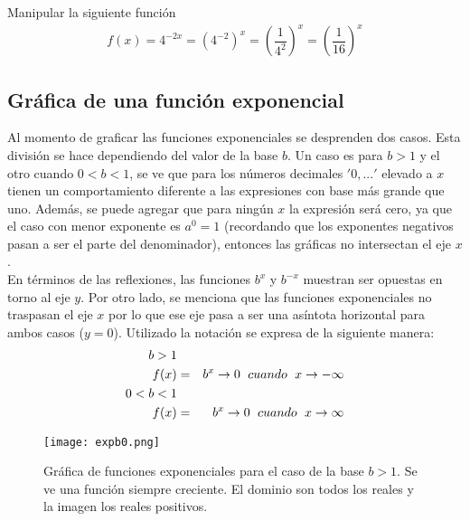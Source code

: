 \begin{myexample}
Manipular la siguiente función
\begin{eqnarray}
f(x)=4^{-2x}=(4^{-2})^{x}=\left(\dfrac{1}{4^{2}} \right)^{x}=\left(\dfrac{1}{16} \right)^{x}
\end{eqnarray}
\end{myexample}

\subsection{Gráfica de una función exponencial}
Al momento de graficar las funciones exponenciales se desprenden dos casos. Esta división se hace dependiendo del valor de la base $b$. Un caso es para $b>1$ y el otro cuando $0<b<1$, se ve que para los números decimales $'0,...'$ elevado a $x$ tienen un comportamiento diferente a las expresiones con base más grande que uno. Además, se puede agregar que para ningún $x$ la expresión será cero, ya que el caso con menor exponente es $a^{0}=1$ (recordando que los exponentes negativos pasan a ser el parte del denominador), entonces las gráficas no intersectan el eje $x$.\\

En términos de las reflexiones, las funciones $b^{x}$ y $b^{-x}$ muestran ser opuestas en torno al eje $y$. Por otro lado, se menciona que las funciones exponenciales no traspasan el eje $x$ por lo que ese eje pasa a ser una asíntota horizontal para ambos casos ($y=0$). Utilizado la notación se expresa de la siguiente manera:
\begin{eqnarray}
b  > 1\nonumber\\
f(x)&=& b^{x}\rightarrow 0 \hspace{6px} cuando \hspace{6px} x\rightarrow -\infty\\
0< b  <1\nonumber\\
f(x)&=& b^{x}\rightarrow 0 \hspace{6px} cuando \hspace{6px} x\rightarrow \infty
\end{eqnarray}

 \begin{center}
\begin{figure}[h!]
\centering
\texttt{[image: expb0.png]}
\caption[Gráfica de funciones exponenciales para el caso de la base $b>1$.]{Gráfica de funciones exponenciales para el caso de la base $b>1$. Se ve una función siempre creciente. El dominio son todos los reales y la imagen los reales positivos.} \label{expb0}
\end{figure}
\end{center}

